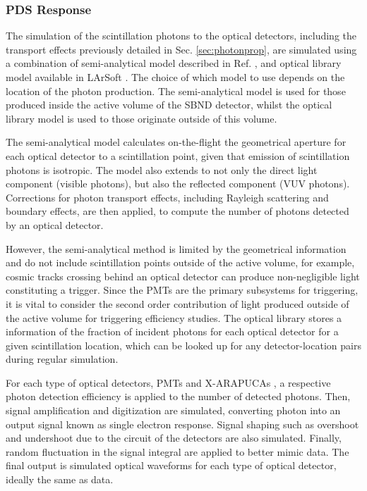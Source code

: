\subsubsection{PDS Response}

The simulation of the scintillation photons to the optical detectors, including the transport effects previously detailed in Sec. \ref{sec:photonprop}, are simulated using a combination of semi-analytical model described in Ref. \cite{}, and optical library model available in LArSoft \cite{}.
The choice of which model to use depends on the location of the photon production.
The semi-analytical model is used for those produced inside the active volume of the SBND detector, whilst the optical library model is used to those originate outside of this volume.

The semi-analytical model calculates on-the-flight the geometrical aperture for each optical detector to a scintillation point, given that emission of scintillation photons is isotropic.
The model also extends to not only the direct light component (visible photons), but also the reflected component (VUV photons). 
Corrections for photon transport effects, including Rayleigh scattering and boundary effects, are then applied, to compute the number of photons detected by an optical detector.

However, the semi-analytical method is limited by the geometrical information and do not include scintillation  points outside of the active volume, for example, cosmic tracks crossing behind an optical detector can produce non-negligible light constituting a trigger.
Since the PMTs are the primary subsystems for triggering, it is vital to consider the second order contribution of light produced outside of the active volume for triggering efficiency studies.
The optical library stores a information of the fraction of incident photons for each optical detector for a given scintillation location, which can be looked up for any detector-location pairs during regular simulation. 

For each type of optical detectors, PMTs and X-ARAPUCAs , a respective photon detection efficiency is applied to the number of detected photons.
Then, signal amplification and digitization are simulated, converting photon into an output signal known as single electron response.
Signal shaping such as overshoot and undershoot due to the circuit of the detectors are also simulated.
Finally, random fluctuation in the signal integral are applied to better mimic data.
The final output is simulated optical waveforms for each type of optical detector, ideally the same as data. 

